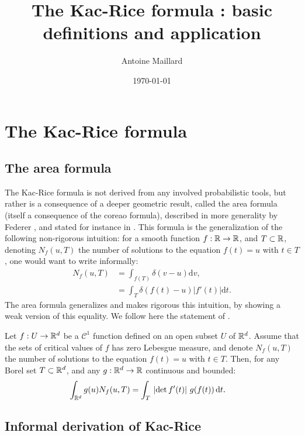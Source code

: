 \documentclass[amsmath,amssymb,nofootinbib,prd]{article}
\begin{document}
\title{The Kac-Rice formula : basic definitions and application}
\date{\today}
\author{Antoine Maillard}
\maketitle
%
\renewcommand{\labelitemi}{$\bullet$}


\section{The Kac-Rice formula}

\subsection{The area formula}
	The Kac-Rice formula is not derived from any involved probabilistic tools, but rather is a consequence of a deeper geometric result, called the area formula (itself a consequence of the coreao formula), described in more generality by Federer \cite{federer1959curvature}, and stated for instance in \cite{azais2009level}. This formula is the generalization of the following non-rigorous intuition: for a smooth function $f : \mathbb{R} \to \mathbb{R}$, and $T \subset \mathbb{R}$, denoting $N_f(u,T)$ the number of solutions to the equation $f(t) = u$ with $t \in T$, one would want to write informally:
	\begin{align}
	N_f(u,T) &= \int_{f(T)} \delta\left(v - u\right) \mathrm{d}v, \\
	  &= \int_T \delta\left(f(t) - u\right) |f'(t)| \mathrm{d}t.
	\end{align}
	The area formula generalizes and makes rigorous this intuition, by showing a weak version of this equality. We follow here the statement of \cite{azais2009level}. 
	\begin{proposition}\label{prop:area}
	Let $f : U \to \mathbb{R}^d$ be a $\mathcal{C}^1$ function defined on an open subset $U$ of $\mathbb{R}^d$. Assume that the sets of critical values of $f$ has zero Lebesgue measure, and denote $N_f(u,T)$  the number of solutions to the equation $f(t) = u$ with $t \in T$. Then, for any Borel set $T \subset \mathbb{R}^d$, and any $g : \mathbb{R}^d \to \mathbb{R}$ continuous and bounded:
	\begin{align}
\int_{\mathbb{R}^d} g(u) N_f(u,T) &= \int_T \, \left|\det f'(t)\right| \, g(f(t)) \,\mathrm{d}t. 	
	\end{align}
	\end{proposition}
	
	
	\subsection{Informal derivation of Kac-Rice}
	
\end{document}
